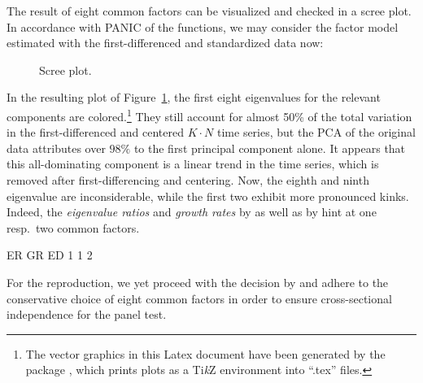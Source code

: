 The result of eight common factors can be visualized and checked in a scree plot. In accordance with PANIC of the  functions, we may consider the factor model estimated with the first-differenced and standardized data now: 
\begin{CodeChunk}
\end{CodeChunk}
\begin{figure}[ht] %
	\centering
	\caption{Scree plot.}
	\resizebox{0.8\textwidth}{!}{
		}
	\label{fig:Scree}
\end{figure}
In the resulting plot of Figure~\ref{fig:Scree}, the first eight eigenvalues for the relevant components are colored.\footnote{The vector graphics in this Latex document have been generated by the  package \citep{SharpsteenEtAl2020}, which prints  plots as a Ti\textit{k}Z environment into ``.tex'' files.} They still account for almost 50\% of the total variation in the first-differenced and centered $K \cdot N$ time series, but the PCA of the original data attributes over $ 98\% $ to the first principal component alone. It appears that this all-dominating component is a linear trend in the time series, which is removed after first-differencing and centering. Now, the eighth and ninth eigenvalue are inconsiderable, while the first two exhibit more pronounced kinks. Indeed, the \textit{eigenvalue ratios}  and \textit{growth rates}  by \citet{AhnHorenstein2013} as well as  by \citet{Onatski2010} hint at one resp.~two common factors.
\begin{CodeChunk}
\begin{CodeOutput}
ER GR ED 
1  1  2 
\end{CodeOutput}
\end{CodeChunk}
For the reproduction, we yet proceed with the decision by \citet{ArsovaOersal2017} and adhere to the conservative choice of eight common factors in order to ensure cross-sectional independence for the panel test.



